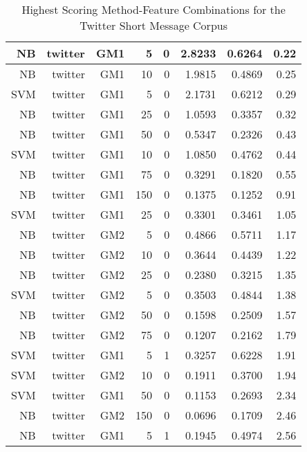 \begin{table}[htbp!]
\begin{center}
\begin{tabular}{ | r | r | r | r | r | r | r | r | }
			NB & twitter & GM1 & 5 & 0 & 2.8233 & 0.6264 & 0.22\\ \hline 
			NB & twitter & GM1 & 10 & 0 & 1.9815 & 0.4869 & 0.25\\ \hline 
			SVM & twitter & GM1 & 5 & 0 & 2.1731 & 0.6212 & 0.29\\ \hline 
			NB & twitter & GM1 & 25 & 0 & 1.0593 & 0.3357 & 0.32\\ \hline 
			NB & twitter & GM1 & 50 & 0 & 0.5347 & 0.2326 & 0.43\\ \hline 
			SVM & twitter & GM1 & 10 & 0 & 1.0850 & 0.4762 & 0.44\\ \hline 
			NB & twitter & GM1 & 75 & 0 & 0.3291 & 0.1820 & 0.55\\ \hline 
			NB & twitter & GM1 & 150 & 0 & 0.1375 & 0.1252 & 0.91\\ \hline 
			SVM & twitter & GM1 & 25 & 0 & 0.3301 & 0.3461 & 1.05\\ \hline 
			NB & twitter & GM2 & 5 & 0 & 0.4866 & 0.5711 & 1.17\\ \hline 
			NB & twitter & GM2 & 10 & 0 & 0.3644 & 0.4439 & 1.22\\ \hline 
			NB & twitter & GM2 & 25 & 0 & 0.2380 & 0.3215 & 1.35\\ \hline 
			SVM & twitter & GM2 & 5 & 0 & 0.3503 & 0.4844 & 1.38\\ \hline 
			NB & twitter & GM2 & 50 & 0 & 0.1598 & 0.2509 & 1.57\\ \hline 
			NB & twitter & GM2 & 75 & 0 & 0.1207 & 0.2162 & 1.79\\ \hline 
			SVM & twitter & GM1 & 5 & 1 & 0.3257 & 0.6228 & 1.91\\ \hline 
			SVM & twitter & GM2 & 10 & 0 & 0.1911 & 0.3700 & 1.94\\ \hline 
			SVM & twitter & GM1 & 50 & 0 & 0.1153 & 0.2693 & 2.34\\ \hline 
			NB & twitter & GM2 & 150 & 0 & 0.0696 & 0.1709 & 2.46\\ \hline 
			NB & twitter & GM1 & 5 & 1 & 0.1945 & 0.4974 & 2.56\\ \hline 

		\end{tabular}
		\caption{Highest Scoring Method-Feature Combinations for the Twitter Short Message Corpus}
		\label{tab:top_twitter_by_score}
	\end{center}
\end{table}


